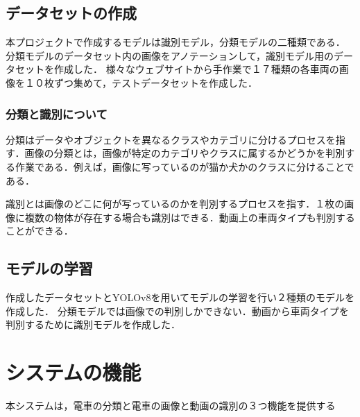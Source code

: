 \begin{multicols*}{2}
\subsection{データセットの作成}
本プロジェクトで作成するモデルは識別モデル，分類モデルの二種類である．%
分類モデルのデータセット内の画像をアノテーションして，識別モデル用のデータセットを作成した．
様々なウェブサイトから手作業で１７種類の各車両の画像を１０枚ずつ集めて，テストデータセットを作成した．

\subsubsection{分類と識別について}
分類はデータやオブジェクトを異なるクラスやカテゴリに分けるプロセスを指す．画像の分類とは，画像が特定のカテゴリやクラスに属するかどうかを判別する作業である．例えば，画像に写っているのが猫か犬かのクラスに分けることである．

識別とは画像のどこに何が写っているのかを判別するプロセスを指す．１枚の画像に複数の物体が存在する場合も識別はできる．動画上の車両タイプも判別することができる．


\subsection{モデルの学習}
作成したデータセットとYOLOv8を用いてモデルの学習を行い２種類のモデルを作成した．
分類モデルでは画像での判別しかできない．動画から車両タイプを判別するために識別モデルを作成した．



\section{システムの機能}
本システムは，電車の分類と電車の画像と動画の識別の３つ機能を提供する


\end{multicols*}

